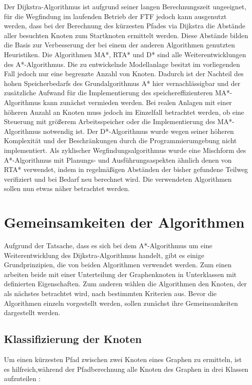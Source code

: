 		Der Dijkstra-Algorithmus ist aufgrund seiner langen Berechnungszeit ungeeignet, für die Wegfindung im laufenden Betrieb der \ac{FTF} jedoch kann ausgenutzt werden, dass bei der Berechnung des kürzesten Pfades via Dijkstra die Abstände aller besuchten Knoten zum Startknoten ermittelt werden. Diese Abstände bilden die Basis zur Verbesserung der bei einem der anderen Algorithmen genutzten Heuristiken. Die Algorithmen \ac{MA*}, \ac{RTA*} und \ac{D*} sind alle Weiterentwicklungen des A*-Algorithmus. Die zu entwickelnde Modellanlage besitzt im vorliegenden Fall jedoch nur eine begrenzte Anzahl von Knoten. Dadurch ist der Nachteil des hohen Speicherbedarfs des Grundalgorithmus A* hier vernachlässigbar und der zusätzliche Aufwand für die Implementierung des speichereffizienteren \ac{MA*}-Algorithmus kann zunächst vermieden  werden. Bei realen Anlagen mit einer höheren Anzahl an Knoten muss jedoch im Einzelfall betrachtet werden, ob eine Steuerung mit größerem Arbeitsspeicher oder die Implementierung des \ac{MA*}-Algorithmus notwendig ist. Der \ac{D*}-Algorithmus wurde wegen seiner höheren Komplexität und der Beschränkungen durch die Programmierumgebung nicht implementiert. Als zyklischer Wegfindungsalgorithmus wurde eine Mischform des A*-Algorithmus mit Planungs- und Ausführungsaspekten ähnlich denen von \ac{RTA*} verwendet, indem in regelmäßigen Abständen der bisher gefundene Teilweg verifiziert und bei Bedarf neu berechnet wird. Die verwendeten Algorithmen sollen nun etwas näher betrachtet werden.

\section{Gemeinsamkeiten der Algorithmen}

	Aufgrund der Tatsache, dass es sich bei dem A*-Algorithmus um eine Weiterentwicklung des Dijkstra-Algorithmus handelt, gibt es einige Grundprinzipien, die von beiden Algorithmen verwendet werden. Zum einen arbeiten beide mit einer Unterteilung der Graphenknoten in Unterklassen mit definierten Eigenschaften. Zum anderen wählen die Algorithmen den Knoten, der als nächstes betrachtet wird, nach bestimmten Kriterien aus. Bevor die Algorithmen einzeln vorgestellt werden, sollen zunächst ihre Gemeinsamkeiten dargestellt werden.
	
	\subsection{Klassifizierung der Knoten}
		\label{Klassifizierung}
		Um einen kürzesten Pfad zwischen zwei Knoten eines Graphen zu ermitteln, ist es hilfreich,während der Pfadberechnung alle Knoten des Graphen in drei Klassen aufzuteilen \cite{DijkstraAlg}:
		
